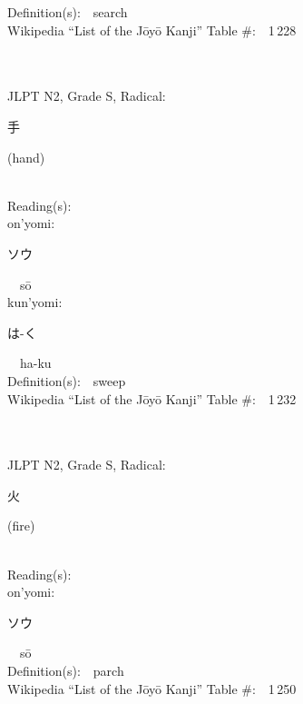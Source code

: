 \begin{multicols}{2}
Definition(s):\ \ search \\
Wikipedia ``List of the J\=oy\=o Kanji'' Table \#:\ \ 1\,228 \\
\ \ \\
{\fontsize{34pt}{40pt}  }\ \ \\  %
{JLPT N2, Grade S, Radical:\ \ {\begin{CJK}{UTF8}{min} 手 \end{CJK}} (hand) } \\
Reading(s):\ \ \\
{\hspace*{1em}}on'yomi:\ \ \\
{\hspace*{2em}}{\begin{CJK}{UTF8}{min} ソウ \end{CJK}}\ \ s\=o\ \ \\
{\hspace*{1em}}kun'yomi:\ \ \\
{\hspace*{2em}}{\begin{CJK}{UTF8}{min} は-く \end{CJK}}\ \ ha-ku\ \ \\
Definition(s):\ \ sweep \\
Wikipedia ``List of the J\=oy\=o Kanji'' Table \#:\ \ 1\,232 \\
\ \ \\
{\fontsize{34pt}{40pt}  }\ \ \\  %
{JLPT N2, Grade S, Radical:\ \ {\begin{CJK}{UTF8}{min} 火 \end{CJK}} (fire) } \\
Reading(s):\ \ \\
{\hspace*{1em}}on'yomi:\ \ \\
{\hspace*{2em}}{\begin{CJK}{UTF8}{min} ソウ \end{CJK}}\ \ s\=o\ \ \\
Definition(s):\ \ parch \\
Wikipedia ``List of the J\=oy\=o Kanji'' Table \#:\ \ 1\,250 \\

\end{multicols}
